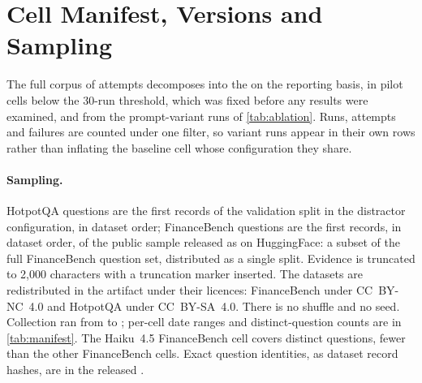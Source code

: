 \section{Cell Manifest, Versions and Sampling}
\label{app:manifest}

\begin{table}[htbp]
\centering\scriptsize
\caption{Run manifest, one row per model, tier, domain and prompt variant.
Runs, attempts and failures use the same prompt-variant filter. \emph{Qs}
is the number of distinct questions; \emph{Collected} is the range of run
timestamps (UTC). Pilot cells (fewer than 30 baseline runs) and
prompt-variant rows are outside the reporting basis.}
\label{tab:manifest}
\resizebox{\linewidth}{!}{}
\end{table}

The full corpus of  attempts decomposes into the
 on the reporting basis, 
in pilot cells below the 30-run threshold, which was fixed before any
results were examined, and  from the
 prompt-variant runs of \cref{tab:ablation}.
Runs, attempts and failures are counted under one filter, so variant runs
appear in their own rows rather than inflating the baseline cell whose
configuration they share.

\paragraph{Sampling.}
HotpotQA questions are the first records of the validation split in the
distractor configuration, in dataset order; FinanceBench questions are the
first records, in dataset order, of the public sample released as
 on HuggingFace: a subset of the full
FinanceBench question set, distributed as a single  split. Evidence
is truncated to 2{,}000 characters with a truncation marker inserted. The
datasets are redistributed in the artifact under their licences: FinanceBench under CC~BY-NC~4.0 and HotpotQA under CC~BY-SA~4.0. There is no shuffle and no
seed. Collection ran from  to
; per-cell date ranges and distinct-question
counts are in \cref{tab:manifest}. The Haiku~4.5 FinanceBench cell covers
 distinct questions,
fewer than the other FinanceBench cells. Exact question identities, as
dataset record hashes, are in the released .

